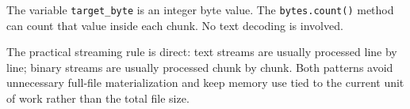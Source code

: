 The variable \texttt{target\_byte} is an integer byte value. The \texttt{bytes.count()} method can count that value inside each chunk. No text decoding is involved.

The practical streaming rule is direct: text streams are usually processed line by line; binary streams are usually processed chunk by chunk. Both patterns avoid unnecessary full-file materialization and keep memory use tied to the current unit of work rather than the total file size.